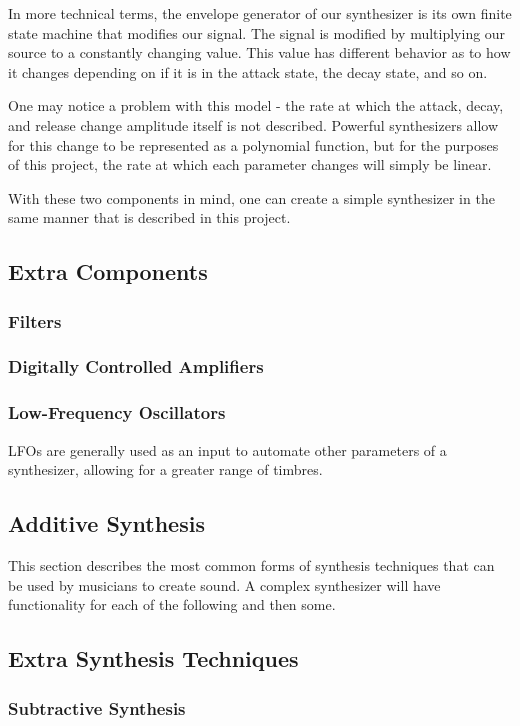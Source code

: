 \documentclass[12pt]{article}
\begin{document}
In more technical terms, the envelope generator of our synthesizer is its own finite state machine that modifies our signal. The signal is modified by multiplying our source to a constantly changing value. This value has different behavior as to how it changes depending on if it is in the attack state, the decay state, and so on.  

One may notice a problem with this model - the rate at which the attack, decay, and release change amplitude itself is not described. Powerful synthesizers allow for this change to be represented as a polynomial function, but for the purposes of this project, the rate at which each parameter changes will simply be linear. 

With these two components in mind, one can create a simple synthesizer in the same manner that is described in this project. 

\subsection{Extra Components}
\subsubsection*{Filters}
\subsubsection*{Digitally Controlled Amplifiers}
\subsubsection*{Low-Frequency Oscillators}
LFOs are generally used as an input to automate other parameters of a synthesizer, allowing for a greater range of timbres.

\subsection{Additive Synthesis}
This section describes the most common forms of synthesis techniques that can be used by musicians to create sound. A complex synthesizer will have functionality for each of the following and then some. 

\subsection{Extra Synthesis Techniques}

\subsubsection*{Subtractive Synthesis}
\end{document}
